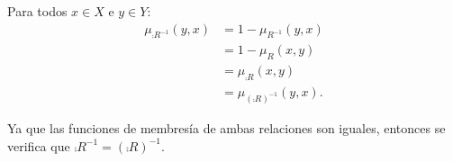 
Para todos \(x ∈ X\) e \(y ∈ Y\):
\begin{align*}
     μ_{\comp{R^{-1}}}(y, x)
  &= 1 - μ_{R^{-1}}(y, x) \\
  &= 1 - μ_R(x, y) \\
  &= μ_{\comp{R}}(x, y) \\
  &= μ_{(\comp{R})^{-1}}(y, x).
\end{align*}

Ya que las funciones de membresía de ambas relaciones son iguales,
entonces se verifica que \(\comp{R^{-1}} = (\comp{R})^{-1}\).

